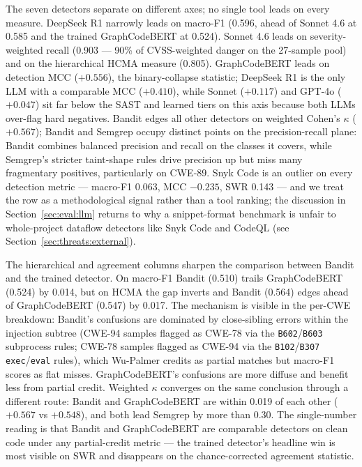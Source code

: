 The seven detectors separate on different axes; no single tool leads
on every measure. DeepSeek R1 narrowly leads on macro-F1 (0.596,
ahead of Sonnet 4.6 at 0.585 and the trained GraphCodeBERT at 0.524).
Sonnet 4.6 leads on severity-weighted recall (0.903 — 90\% of
CVSS-weighted danger on the 27-sample pool) and on the hierarchical
HCMA measure (0.805). GraphCodeBERT leads on detection MCC
($+0.556$), the binary-collapse statistic; DeepSeek R1 is the only
LLM with a comparable MCC ($+0.410$), while Sonnet ($+0.117$) and
GPT-4o ($+0.047$) sit far below the SAST and learned tiers on this
axis because both LLMs over-flag hard negatives. Bandit edges all
other detectors on weighted Cohen's $\kappa$ ($+0.567$); Bandit and
Semgrep occupy distinct points on the precision-recall plane:
Bandit combines balanced precision and recall on the classes it
covers, while Semgrep's stricter taint-shape rules drive precision
up but miss many fragmentary positives, particularly on CWE-89.
Snyk Code is an outlier on every detection metric — macro-F1 0.063,
MCC $-0.235$, SWR 0.143 — and we treat the row as a methodological
signal rather than a tool ranking; the discussion in
Section~\ref{sec:eval:llm} returns to why a snippet-format benchmark
is unfair to whole-project dataflow detectors like Snyk Code and
CodeQL (see Section~\ref{sec:threats:external}).

The hierarchical and agreement columns sharpen the comparison
between Bandit and the trained detector. On macro-F1 Bandit
(0.510) trails GraphCodeBERT (0.524) by 0.014, but on HCMA the gap
inverts and Bandit (0.564) edges ahead of GraphCodeBERT (0.547)
by 0.017. The mechanism is visible in the per-CWE breakdown:
Bandit's confusions are dominated by close-sibling errors within
the injection subtree (CWE-94 samples flagged as CWE-78 via the
\texttt{B602}/\texttt{B603} subprocess rules; CWE-78 samples
flagged as CWE-94 via the \texttt{B102}/\texttt{B307}
\texttt{exec}/\texttt{eval} rules), which Wu-Palmer credits as
partial matches but macro-F1 scores as flat misses. GraphCodeBERT's
confusions are more diffuse and benefit less from partial credit.
Weighted $\kappa$ converges on the same conclusion through a
different route: Bandit and GraphCodeBERT are within 0.019 of each
other ($+0.567$ vs $+0.548$), and both lead Semgrep by more than
0.30. The single-number reading is that Bandit and GraphCodeBERT
are comparable detectors on clean code under any partial-credit
metric — the trained detector's headline win is most visible on
SWR and disappears on the chance-corrected agreement statistic.

